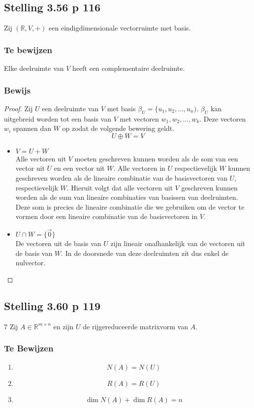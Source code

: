 \documentclass[lineaire_algebra_oplossingen.tex]{subfiles}
\begin{document}
\subsection{Stelling 3.56 p 116}
\label{3.56}
Zij $(\mathbb{R},V,+)$ een eindigdimensionale vectorruimte met basis.

\subsubsection*{Te bewijzen}
Elke deelruimte van $V$ heeft een complementaire deelruimte.

\subsubsection*{Bewijs}
\begin{proof}
Zij $U$ een deelruimte van $V$ met basis $\beta_U = \{u_1,u_2,...,u_n)$. $\beta_U$ kan uitgebreid worden tot een basis van $V$ met vectoren $w_1,w_2,...,w_k$. Deze vectoren $w_i$ spannen dan $W$ op zodat de volgende bewering geldt.
\[
U \oplus W = V
\]
\begin{itemize}
\item $V = U + W$\\
Alle vectoren uit $V$ moeten geschreven kunnen worden als de som van een vector uit $U$ en een vector uit $W$. Alle vectoren in $U$ respectievelijk $W$ kunnen geschreven worden als de lineaire combinatie van de basisvectoren van $U$, respectievelijk $W$. Hieruit volgt dat alle vectoren uit $V$ geschreven kunnen worden als de sum van lineaire combinaties van basissen van deelruimten. Deze som is precies de lineaire combinatie die we gebruiken om de vector te vormen door een lineaire combinatie van de basisvectoren in $V$.

\item $U\cap W = \{\vec{0}\}$\\
De vectoren uit de basis van $U$ zijn lineair onafhankelijk van de vectoren uit de basis van $W$. In de doorsnede van deze deelruimten zit dus enkel de nulvector.
\end{itemize}
\end{proof}


\subsection{Stelling 3.60 p 119}7
\label{3.60}
Zij $A \in \mathbb{R}^{m\times n}$ en zijn $U$ de rijgereduceerde matrixvorm van $A$.

\subsubsection*{Te Bewijzen}
\begin{enumerate}
\item 
\[
N(A) = N(U)
\]
\item
\[
R(A) = R(U)
\]
\item
\[
\dim N(A) + \dim R(A) = n
\]
\end{enumerate}
\end{document}
